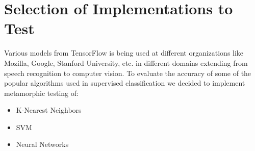 \section{Selection of Implementations to Test}
Various models from TensorFlow is being used at different organizations like Mozilla, Google, Stanford University, etc. in different domains extending from speech recognition to computer vision. To evaluate the accuracy of some of the popular algorithms used in supervised classification we decided to implement metamorphic testing of:
\begin{itemize}
\item K-Nearest Neighbors
\item SVM
\item Neural Networks
\end{itemize}
